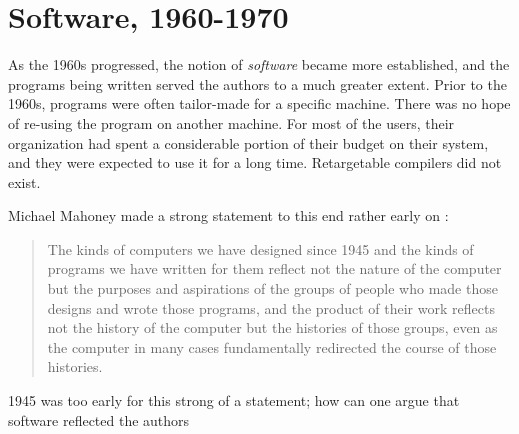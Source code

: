 \chapter{Software, 1960-1970}

As the 1960s progressed, the notion of \textit{software} became more established,
and the programs being written served the authors to a much greater extent.
Prior to the 1960s, programs were often tailor-made for a specific machine.
There was no hope of re-using the program on another machine.
For most of the users, their organization had spent a considerable portion
of their budget on their system, and they were expected to use it for a long time.
Retargetable compilers did not exist.

Michael Mahoney made a strong statement to this end rather early on \cite[The Structures of Computation]{the_first_computers_2002}:
\begin{quotation}
The kinds of computers we have
designed since 1945 and the kinds of programs we have written for them reflect not the nature of the
computer but the purposes and aspirations of the groups of people who made those designs and wrote those
programs, and the product of their work reflects not the history of the computer but the histories of those
groups, even as the computer in many cases fundamentally redirected the course of those histories.
\end{quotation}

1945 was too early for this strong of a statement; how can one argue that software
reflected the authors 
